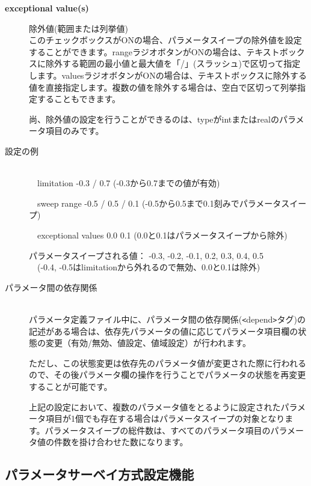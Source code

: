 \documentclass[a4paper,11pt]{jarticle}
\begin{document}
\begin{description}
\item[{\bf exceptional value(s)}] 除外値(範囲または列挙値)\\
このチェックボックスがONの場合、パラメータスイープの除外値を設定することができます。rangeラジオボタンがONの場合は、テキストボックスに除外する範囲の最小値と最大値を「/」(スラッシュ)で区切って指定します。valuesラジオボタンがONの場合は、テキストボックスに除外する値を直接指定します。複数の値を除外する場合は、空白で区切って列挙指定することもできます。

尚、除外値の設定を行うことができるのは、typeがintまたはrealのパラメータ項目のみです。
\end{description}

\begin{description}
\item[設定の例] \begin{tt}{\ }\\
　limitation -0.3 / 0.7 (-0.3から0.7までの値が有効)

　sweep range -0.5 / 0.5 / 0.1 (-0.5から0.5まで0.1刻みでパラメータスイープ)

　exceptional values 0.0 0.1 (0.0と0.1はパラメータスイープから除外)

パラメータスイープされる値： -0.3, -0.2, -0.1,   0.2,  0.3,  0.4,  0.5\\
　(-0.4, -0.5はlimitationから外れるので無効、0.0と0.1は除外)
\end{tt}

\item[パラメータ間の依存関係]{\ }\\
パラメータ定義ファイル中に、パラメータ間の依存関係(\texttt{<}depend\texttt{>}タグ)の記述がある場合は、依存先パラメータの値に応じてパラメータ項目欄の状態の変更（有効/無効、値設定、値域設定）が行われます。

ただし、この状態変更は依存先のパラメータ値が変更された際に行われるので、その後パラメータ欄の操作を行うことでパラメータの状態を再変更することが可能です。

上記の設定において、複数のパラメータ値をとるように設定されたパラメータ項目が1個でも存在する場合はパラメータスイープの対象となります。パラメータスイープの総件数は、すべてのパラメータ項目のパラメータ値の件数を掛け合わせた数になります。
\end{description}


\subsection{パラメータサーベイ方式設定機能}
\end{document}

